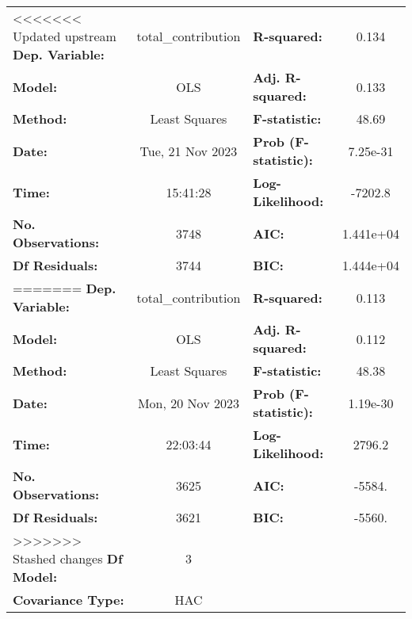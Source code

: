 \begin{center}
\begin{tabular}{lclc}
\toprule
<<<<<<< Updated upstream
\textbf{Dep. Variable:}             & total\_contribution & \textbf{  R-squared:         } &     0.134   \\
\textbf{Model:}                     &         OLS         & \textbf{  Adj. R-squared:    } &     0.133   \\
\textbf{Method:}                    &    Least Squares    & \textbf{  F-statistic:       } &     48.69   \\
\textbf{Date:}                      &   Tue, 21 Nov 2023  & \textbf{  Prob (F-statistic):} &  7.25e-31   \\
\textbf{Time:}                      &       15:41:28      & \textbf{  Log-Likelihood:    } &   -7202.8   \\
\textbf{No. Observations:}          &          3748       & \textbf{  AIC:               } & 1.441e+04   \\
\textbf{Df Residuals:}              &          3744       & \textbf{  BIC:               } & 1.444e+04   \\
=======
\textbf{Dep. Variable:}             & total\_contribution & \textbf{  R-squared:         } &     0.113   \\
\textbf{Model:}                     &         OLS         & \textbf{  Adj. R-squared:    } &     0.112   \\
\textbf{Method:}                    &    Least Squares    & \textbf{  F-statistic:       } &     48.38   \\
\textbf{Date:}                      &   Mon, 20 Nov 2023  & \textbf{  Prob (F-statistic):} &  1.19e-30   \\
\textbf{Time:}                      &       22:03:44      & \textbf{  Log-Likelihood:    } &    2796.2   \\
\textbf{No. Observations:}          &          3625       & \textbf{  AIC:               } &    -5584.   \\
\textbf{Df Residuals:}              &          3621       & \textbf{  BIC:               } &    -5560.   \\
>>>>>>> Stashed changes
\textbf{Df Model:}                  &             3       & \textbf{                     } &             \\
\textbf{Covariance Type:}           &         HAC         & \textbf{                     } &             \\
\bottomrule
\end{tabular}

\end{center}
